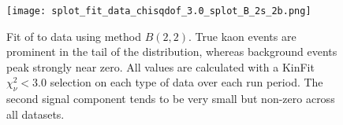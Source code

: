 \begin{figure}
  \begin{center}
    \texttt{[image: splot\_fit\_data\_chisqdof\_3.0\_splot\_B\_2s\_2b.png]}
  \end{center}
  \caption{Fit of  to data using method $B(2,2)$. True kaon events are prominent in the tail of the distribution, whereas background events peak strongly near zero. All values are calculated with a KinFit $\chi^2_\nu < 3.0$ selection on each type of data over each run period. The second signal component tends to be very small but non-zero across all datasets.}\label{fig:splot-data-fit}
\end{figure}


